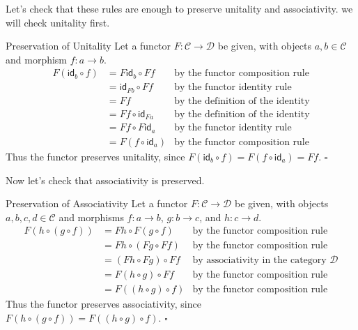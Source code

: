 \documentclass[12pt]{article}
\begin{document}
Let's check that these rules are enough to preserve unitality and associativity.
we will check unitality first.
\begin{proofbox}{Preservation of Unitality}{}
    Let a functor $F:\mathcal{C} \rightarrow \mathcal{D}$ be given, with objects $a,b\in\mathcal{C}$ and morphism $f:a \rightarrow b$.
    \begin{align*}
        F(\mathsf{id}_b \circ f) & = F\mathsf{id}_b \circ Ff   & \text{by the functor composition rule}   \\
                                 & = \mathsf{id}_{Fb} \circ Ff & \text{by the functor identity rule}      \\
                                 & = Ff                        & \text{by the definition of the identity} \\
                                 & = Ff \circ \mathsf{id}_{Fa} & \text{by the definition of the identity} \\
                                 & = Ff \circ F\mathsf{id}_a   & \text{by the functor identity rule}      \\
                                 & = F(f \circ \mathsf{id}_a)  & \text{by the functor composition rule}
    \end{align*}
    Thus the functor preserves unitality, since $F(\mathsf{id}_b \circ f) = F(f \circ \mathsf{id}_a) = Ff$. $\square$
\end{proofbox}
Now let's check that associativity is preserved.
\begin{proofbox}{Preservation of Associativity}{}
    Let a functor $F:\mathcal{C} \rightarrow \mathcal{D}$ be given, with objects $a,b,c,d\in\mathcal{C}$ and morphisms $f:a \rightarrow b$, $g:b \rightarrow c$, and $h:c \rightarrow d$.
    \begin{align*}
        F(h \circ (g \circ f)) & = Fh \circ F(g \circ f)  & \text{by the functor composition rule}                \\
                               & = Fh \circ (Fg \circ Ff) & \text{by the functor composition rule}                \\
                               & = (Fh \circ Fg) \circ Ff & \text{by associativity in the category $\mathcal{D}$} \\
                               & = F(h \circ g) \circ Ff  & \text{by the functor composition rule}                \\
                               & = F((h \circ g) \circ f) & \text{by the functor composition rule}
    \end{align*}
    Thus the functor preserves associativity, since $F(h \circ (g \circ f)) = F((h \circ g) \circ f)$. $\square$
\end{proofbox}
\end{document}

